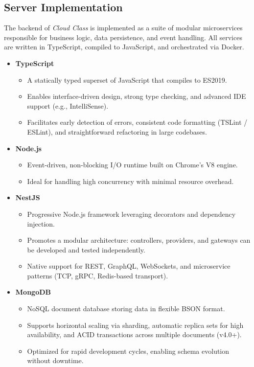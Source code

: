 \subsection{Server Implementation}

The backend of \emph{Cloud Class} is implemented as a suite of modular microservices responsible for business logic, data persistence, and event handling.  All services are written in \mbox{TypeScript}, compiled to JavaScript, and orchestrated via Docker.

\begin{itemize}
  \item \textbf{TypeScript}  
    \begin{itemize}
      \item A statically typed superset of JavaScript that compiles to ES2019.  
      \item Enables interface-driven design, strong type checking, and advanced IDE support (e.g., IntelliSense).  
      \item Facilitates early detection of errors, consistent code formatting (TSLint / ESLint), and straightforward refactoring in large codebases.
    \end{itemize}

  \item \textbf{Node.js}  
    \begin{itemize}
      \item Event-driven, non-blocking I/O runtime built on Chrome’s V8 engine.  
      \item Ideal for handling high concurrency with minimal resource overhead.  
    \end{itemize}

  \item \textbf{NestJS}  
    \begin{itemize}
      \item Progressive Node.js framework leveraging decorators and dependency injection.  
      \item Promotes a modular architecture: controllers, providers, and gateways can be developed and tested independently.  
      \item Native support for REST, GraphQL, WebSockets, and microservice patterns (TCP, gRPC, Redis-based transport).
    \end{itemize}

  \item \textbf{MongoDB}  
    \begin{itemize}
      \item NoSQL document database storing data in flexible BSON format.  
      \item Supports horizontal scaling via sharding, automatic replica sets for high availability, and ACID transactions across multiple documents (v4.0+).  
      \item Optimized for rapid development cycles, enabling schema evolution without downtime.
    \end{itemize}


\end{itemize}
